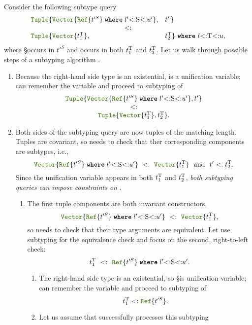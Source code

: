 Consider the following subtype query 
\[
  \begin{array}{ll}
    \jlname{Tuple}\{\vectyp{\wheret{\reftyp{\t'^S}}{l'{<:}\S{<:}u'}}, &
      t'\,\}\\
    \multicolumn{2}{c}{<:} \\
    \jlname{Tuple}\{\vectyp{t_1^{\T}}, & t_2^{\T}\} 
      \ \textbf{\texttt{where}}\ l{<:}\T{<:}u,
  \end{array}
\]
where \S occurs in $t'^S$ and \T occurs in both $t_1^{\mathrm{T}}$ and $t_2^{\mathrm{T}}$.
Let us walk through possible steps of a subtyping algorithm \algo.
\begin{enumerate}
  \item Because the right-hand side type is an existential,
    \T is a unification variable; \algo can remember the variable and proceed
    to subtyping of
    \[ 
      \begin{array}{c}
        \tupletyp{\vectyp{\wheret{\reftyp{\t'^S}}{l'{<:}\S{<:}u'}}, t'} \\
        <: \\
        \tupletyp{\vectyp{t_1^{\T}}, t_2^{\T}}. 
      \end{array}
    \]
  \item Both sides of the subtyping query are now tuples of the matching length.
    Tuples are covariant, so \algo needs to check that ther corresponding 
    components are subtypes, i.e.,
    \[ 
      \vectyp{\wheret{\reftyp{\t'^S}}{l'{<:}\S{<:}u'}}\ <:\ \vectyp{t_1^{\T}} 
      \ \ \text{and}\ \ t' <: t_2^{\T}.
    \]
    Since the unification variable \T appears in both $t_1^{\mathrm{T}}$ and $t_2^{\mathrm{T}}$,
    \emph{both subtyping queries can impose constraints on \T}.
    \begin{enumerate}
      \item The first tuple components are both invariant constructors,
        \[ 
          \vectyp{\wheret{\reftyp{\t'^S}}{l'{<:}\S{<:}u'}} 
          \ <:\  
          \vectyp{t_1^{\T}}, 
        \]
        so \algo needs to check that their type arguments are equivalent.
        Let \algo use subtyping for the equivalence check and focus
        on the second, right-to-left check:
        \[ t_1^{\T}\ <:\ \wheret{\reftyp{\t'^S}}{l'{<:}\S{<:}u'}. \]
        \begin{enumerate}
          \item The right-hand side type is an existential, so \S is unification
            variable; \algo can remember the variable and proceed to 
            subtyping of \[ t_1^{\T} <: \reftyp{\t'^S}. \]
          \item Let us assume that \algo successfully processes this subtyping

\end{enumerate}
\end{enumerate}
\end{enumerate}
